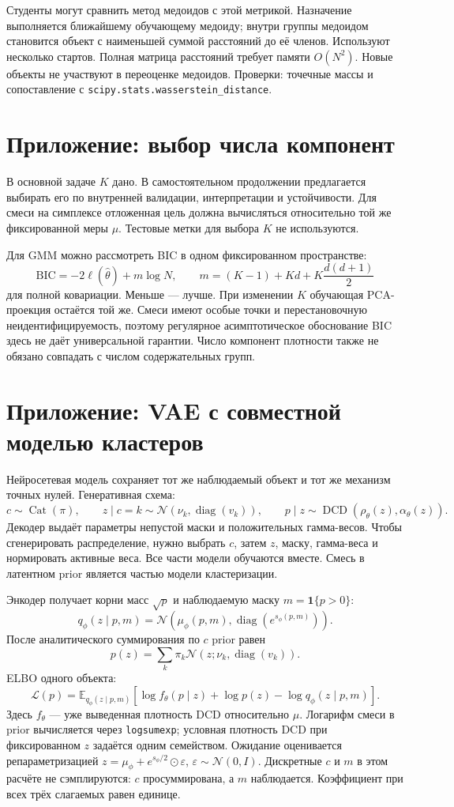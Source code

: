 \documentclass[11pt,a4paper]{article}
\newcommand{\E}{\mathbb E}
\newcommand{\Normal}{\mathcal N}
\newcommand{\diag}{\operatorname{diag}}
\begin{document}
Студенты могут сравнить метод медоидов с этой метрикой. Назначение
выполняется ближайшему обучающему медоиду; внутри группы медоидом
становится объект с наименьшей суммой расстояний до её членов.
Используют несколько стартов. Полная матрица расстояний требует памяти
$O(N^2)$. Новые объекты не участвуют в переоценке медоидов.
Проверки: точечные массы и сопоставление с
\texttt{scipy.stats.wasserstein\_distance}.

\section{Приложение: выбор числа компонент}

В основной задаче $K$ дано. В самостоятельном продолжении предлагается
выбирать его по внутренней валидации, интерпретации и устойчивости.
Для смеси на симплексе отложенная цель должна вычисляться относительно
той же фиксированной меры $\mu$. Тестовые метки для выбора $K$ не используются.

Для GMM можно рассмотреть BIC в одном фиксированном пространстве:
\[
 \mathrm{BIC}=-2\ell(\widehat\theta)+m\log N,\qquad
 m=(K-1)+Kd+K\frac{d(d+1)}2
\]
для полной ковариации. Меньше --- лучше. При изменении $K$ обучающая
PCA-проекция остаётся той же. Смеси имеют особые точки и перестановочную
неидентифицируемость, поэтому регулярное асимптотическое обоснование BIC
здесь не даёт универсальной гарантии. Число компонент плотности также
не обязано совпадать с числом содержательных групп.

\section{Приложение: VAE с совместной моделью кластеров}

Нейросетевая модель сохраняет тот же наблюдаемый объект и тот же
механизм точных нулей. Генеративная схема:
\[
 c\sim\operatorname{Cat}(\pi),\qquad
 z\mid c=k\sim\Normal(\nu_k,\diag(v_k)),\qquad
 p\mid z\sim\operatorname{DCD}(\rho_\theta(z),\alpha_\theta(z)).
\]
Декодер выдаёт параметры непустой маски и положительных гамма-весов.
Чтобы сгенерировать распределение, нужно выбрать $c$, затем $z$, маску,
гамма-веса и нормировать активные веса. Все части модели обучаются вместе.
Смесь в латентном prior является частью модели кластеризации.

Энкодер получает корни масс $\sqrt p$ и наблюдаемую маску
$m=\mathbf1\{p>0\}$:
\[
 q_\phi(z\mid p,m)=\Normal(\mu_\phi(p,m),\diag(e^{s_\phi(p,m)})).
\]
После аналитического суммирования по $c$ prior равен
\[
 p(z)=\sum_k\pi_k\Normal(z;\nu_k,\diag(v_k)).
\]
ELBO одного объекта:
\[
 \mathcal L(p)=\E_{q_\phi(z\mid p,m)}
 [\log f_\theta(p\mid z)+\log p(z)-\log q_\phi(z\mid p,m)].
\]
Здесь $f_\theta$ --- уже выведенная плотность DCD относительно $\mu$.
Логарифм смеси в prior вычисляется через \texttt{logsumexp};
условная плотность DCD при фиксированном $z$ задаётся одним семейством.
Ожидание оценивается репараметризацией
$z=\mu_\phi+e^{s_\phi/2}\odot\varepsilon$,
$\varepsilon\sim\Normal(0,I)$.
Дискретные $c$ и $m$ в этом расчёте не сэмплируются: $c$ просуммирована,
а $m$ наблюдается. Коэффициент при всех трёх слагаемых равен единице.
\end{document}
